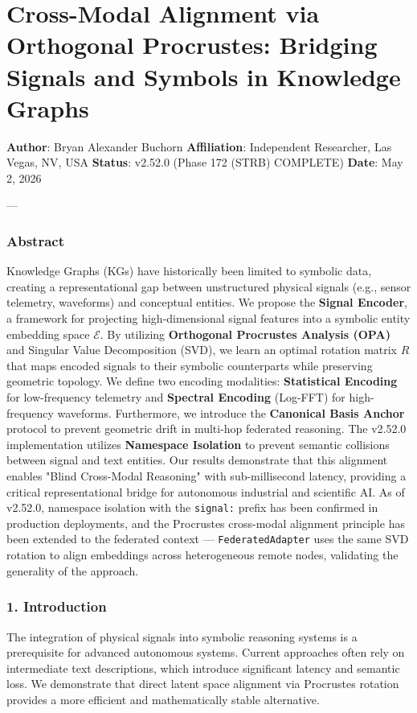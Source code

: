 \section{Cross-Modal Alignment via Orthogonal Procrustes: Bridging Signals and Symbols in Knowledge Graphs}

\textbf{Author}: Bryan Alexander Buchorn  
\textbf{Affiliation}: Independent Researcher, Las Vegas, NV, USA  
\textbf{Status}: v2.52.0 (Phase 172 (STRB) COMPLETE)
\textbf{Date}: May 2, 2026

---

\subsubsection{Abstract}
Knowledge Graphs (KGs) have histo\-rically been limited to symbolic data, creating a repre\-sentational gap between unstr\-uctured physical signals (e.g., sensor telemetry, waveforms) and conceptual entities. We propose the \textbf{Signal Encoder}, a framework for projecting high-dimensional signal features into a symbolic entity embedding space $\mathcal{E}$. By utilizing \textbf{Orthogonal Procrustes Analysis (OPA)} \cite{schonemann1966procrustes, gower2004procrustes} and Singular Value Decomp\-osition (SVD), we learn an optimal rotation matrix $R$ that maps encoded signals to their symbolic count\-erparts while preserving geometric topology. We define two encoding modalities: \textbf{Statistical Encoding} for low-frequency telemetry and \textbf{Spectral Encoding} (Log-FFT) for high-frequency waveforms. Furthermore, we introduce the \textbf{Canonical Basis Anchor} protocol to prevent geometric drift in multi-hop federated reasoning. The v2.52.0 imple\-mentation utilizes \textbf{Namespace Isolation} to prevent semantic collisions between signal and text entities. Our results demonstrate that this alignment enables "Blind Cross-Modal Reasoning" with sub-millisecond latency, providing a critical repre\-sentational bridge for autonomous industrial and scientific AI. As of v2.52.0, namespace isolation with the \texttt{signal:} prefix has been confirmed in production deployments, and the Procrustes cross-modal alignment principle has been extended to the federated context — \texttt{FederatedAdapter} uses the same SVD rotation to align embeddings across heter\-ogeneous remote nodes, validating the generality of the approach.

\subsubsection{1. Introd\-uction}
The integration of physical signals into symbolic reasoning systems is a prere\-quisite for advanced autonomous systems. Current approaches often rely on inter\-mediate text descr\-iptions, which introduce significant latency and semantic loss. We demonstrate that direct latent space alignment via Procrustes rotation provides a more efficient and mathe\-matically stable alternative.

